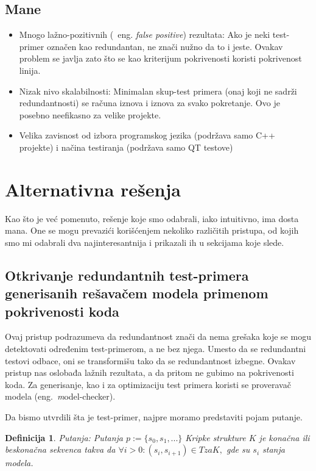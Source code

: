 \documentclass[a4paper]{article}
\newtheorem{definition}{Definicija}[section]
\begin{document}
\subsection{Mane}
\label{subsec:mane}
\begin{itemize}
    \item Mnogo lažno-pozitivnih (~eng. \textit{false positive}) rezultata: Ako je neki test-primer označen kao redundantan, ne znači nužno da to i jeste. Ovakav problem se javlja zato što se kao kriterijum pokrivenosti koristi pokrivenost linija.
    \item Nizak nivo skalabilnosti: Minimalan skup-test primera (onaj koji ne sadrži redundantnosti) se računa iznova i iznova za svako pokretanje. Ovo je posebno neefikasno za velike projekte.
    \item Velika zavisnost od izbora programskog jezika (podržava samo C++ projekte) i načina testiranja (podržava samo QT testove) 
\end{itemize}


\section{Alternativna rešenja}
\label{sec:alternative}

Kao što je već pomenuto, rešenje koje smo odabrali, iako intuitivno, ima dosta mana. One se mogu prevazići korišćenjem nekoliko različitih pristupa, od kojih smo mi odabrali dva najinteresantnija i prikazali ih u sekcijama koje slede.

\subsection{Otkrivanje redundantnih test-primera generisanih rešavačem modela primenom pokrivenosti koda}
\label{subsec:prvi}

Ovaj pristup\cite{prvinacin} podrazumeva da redundantnost znači da nema grešaka koje se mogu detektovati određenim test-primerom, a ne bez njega. Umesto da se redundantni testovi odbace, oni se transformišu tako da se redundantnost izbegne. Ovakav pristup nas oslobađa lažnih rezultata, a da pritom ne gubimo na pokrivenosti koda. Za generisanje, kao i za optimizaciju test primera koristi se proveravač modela (eng.~{\textit model-checker}).

Da bismo utvrdili šta je test-primer, najpre moramo predstaviti pojam putanje.

\begin{definition}{Putanja:}
Putanja $ p := \{s_0, s_1, ...\}$ Kripke strukture $K$ je konačna ili beskonačna sekvenca takva da $ \forall i > 0 : (s_i, s_{i+1}) \in T za K, $ gde su $ s_i $ stanja modela.
\end{definition}
\end{document}
